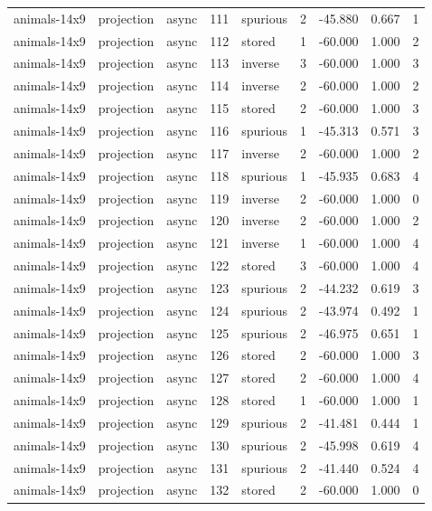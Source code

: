 \begin{tabular}{lllrlrrrr}
animals-14x9 & projection & async & 111 & spurious & 2 & -45.880 & 0.667 & 1 \\
animals-14x9 & projection & async & 112 & stored & 1 & -60.000 & 1.000 & 2 \\
animals-14x9 & projection & async & 113 & inverse & 3 & -60.000 & 1.000 & 3 \\
animals-14x9 & projection & async & 114 & inverse & 2 & -60.000 & 1.000 & 2 \\
animals-14x9 & projection & async & 115 & stored & 2 & -60.000 & 1.000 & 3 \\
animals-14x9 & projection & async & 116 & spurious & 1 & -45.313 & 0.571 & 3 \\
animals-14x9 & projection & async & 117 & inverse & 2 & -60.000 & 1.000 & 2 \\
animals-14x9 & projection & async & 118 & spurious & 1 & -45.935 & 0.683 & 4 \\
animals-14x9 & projection & async & 119 & inverse & 2 & -60.000 & 1.000 & 0 \\
animals-14x9 & projection & async & 120 & inverse & 2 & -60.000 & 1.000 & 2 \\
animals-14x9 & projection & async & 121 & inverse & 1 & -60.000 & 1.000 & 4 \\
animals-14x9 & projection & async & 122 & stored & 3 & -60.000 & 1.000 & 4 \\
animals-14x9 & projection & async & 123 & spurious & 2 & -44.232 & 0.619 & 3 \\
animals-14x9 & projection & async & 124 & spurious & 2 & -43.974 & 0.492 & 1 \\
animals-14x9 & projection & async & 125 & spurious & 2 & -46.975 & 0.651 & 1 \\
animals-14x9 & projection & async & 126 & stored & 2 & -60.000 & 1.000 & 3 \\
animals-14x9 & projection & async & 127 & stored & 2 & -60.000 & 1.000 & 4 \\
animals-14x9 & projection & async & 128 & stored & 1 & -60.000 & 1.000 & 1 \\
animals-14x9 & projection & async & 129 & spurious & 2 & -41.481 & 0.444 & 1 \\
animals-14x9 & projection & async & 130 & spurious & 2 & -45.998 & 0.619 & 4 \\
animals-14x9 & projection & async & 131 & spurious & 2 & -41.440 & 0.524 & 4 \\
animals-14x9 & projection & async & 132 & stored & 2 & -60.000 & 1.000 & 0 \\

\end{tabular}
